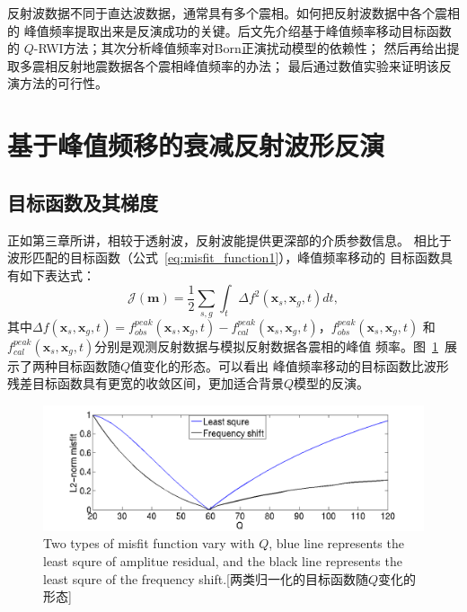 反射波数据不同于直达波数据，通常具有多个震相。如何把反射波数据中各个震相的
峰值频率提取出来是反演成功的关键。后文先介绍基于峰值频率移动目标函数的
$Q$-RWI方法；其次分析峰值频率对Born正演扰动模型的依赖性；
然后再给出提取多震相反射地震数据各个震相峰值频率的办法；
最后通过数值实验来证明该反演方法的可行性。


\newpage
\section{基于峰值频移的衰减反射波形反演}
\subsection{目标函数及其梯度}
正如第三章所讲，相较于透射波，反射波能提供更深部的介质参数信息。
相比于波形匹配的目标函数（公式~\ref{eq:misfit_function1}），峰值频率移动的
目标函数具有如下表达式：
\begin{equation}
    \mathcal{J}(\mathbf{m})=\frac{1}{2}\sum_{s,g}\int_t\Delta f^2(\mathbf{x}_s,\mathbf{x}_g,t)dt,
    \label{eq:freq_misfit_function}
\end{equation}
其中$\Delta f(\mathbf{x}_s,\mathbf{x}_g,t)=f^{peak}_{obs}(\mathbf{x}_s,\mathbf{x}_g,t)-
f^{peak}_{cal}(\mathbf{x}_s,\mathbf{x}_g,t)$，$f^{peak}_{obs}(\mathbf{x}_s,\mathbf{x}_g,t)$
和$f^{peak}_{cal}(\mathbf{x}_s,\mathbf{x}_g,t)$分别是观测反射数据与模拟反射数据各震相的峰值
频率。图~\ref{fig:misfit_com}~展示了两种目标函数随$Q$值变化的形态。可以看出
峰值频率移动的目标函数比波形残差目标函数具有更宽的收敛区间，更加适合背景$Q$模型的反演。
\begin{figure}[!htbp]
    \centering
    {\includegraphics[width=0.98\linewidth]{figure/misfit_com}}
	{Two types of misfit function vary with $Q$, blue line represents the least 
	squre of amplitue residual, and the black line represents the least squre of 
	the frequency shift.}[两类归一化的目标函数随$Q$变化的形态]
    \label{fig:misfit_com}
\end{figure}

